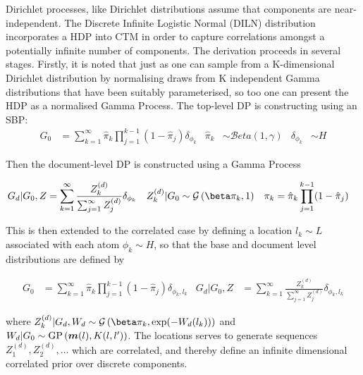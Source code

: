 Dirichlet processes, like Dirichlet distributions assume that components are near-independent. The Discrete Infinite Logistic Normal (DILN) distribution\cite{Paisley2012} incorporates a HDP into CTM in order to capture correlations amongst a potentially infinite number of components. The derivation proceeds in several stages. Firstly, it is noted that just as one can sample from a K-dimensional Dirichlet distribution by normalising draws from K independent Gamma distributions that have been suitably parameterised, so too one can present the HDP as a normalised Gamma Process. The top-level DP is constructing using an SBP:
\begin{align}
G_0 & = \sum_{k=1}^\infty \hat{\pi}_k \prod_{j=1}^{k-1} (1 - \hat{\pi}_j)\delta_{\phi_k} & 
\hat{\pi}_k & \sim \mathcal{B}eta\left(1, \gamma\right) &
\delta_{\phi_k} & \sim H
\end{align}

Then the document-level DP is constructed using a Gamma Process

\begin{align}
G_d|G_0, Z & = \sum_{k=1}^\infty \frac{Z_k^{(d)}}{\sum_{j=1}^\infty Z_j^{(d)}} \delta_{\phi_k} &
Z_k^{(d)} | G_0 &\sim \gam{\beta \pi_k}{1} &
\pi_k & = \hat{\pi}_k \prod_{j=1}^{k-1} (1 - \hat{\pi}_j)
\end{align}

This is then extended to the correlated case by defining a location $l_k \sim L$ associated with each atom $\phi_k \sim H$, so that the base and document level distributions are defined by

\begin{align}
G_0 & = \sum_{k=1}^\infty \hat{\pi}_k \prod_{j=1}^{k-1} (1 - \hat{\pi}_j)\delta_{\phi_k,l_k} &
G_d|G_0, Z & = \sum_{k=1}^\infty \frac{Z_k^{(d)}}{\sum_{j=1}^\infty Z_j^{(d)}} \delta_{\phi_k, l_k}
\end{align}

where $Z_k^{(d)} | G_d, W_d \sim \gam{\beta \pi_k}{\exp(-W_d(l_k))}$ and $W_d | G_0 \sim \text{GP}\left(\bm m(l), K(l, l')\right)$. The locations serves to generate sequences $Z_1^{(d)}, Z_2^{(d)},\ldots$ which are correlated, and thereby define an infinite dimensional correlated prior over discrete components.





